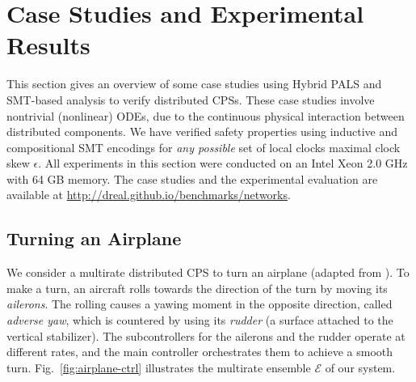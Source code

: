 
%
\section{Case Studies and Experimental Results}
\label{sec:case-studies}

This section gives an overview of some 
case studies using Hybrid PALS and SMT-based analysis to verify %
distributed CPSs. 
%
These case studies involve nontrivial (nonlinear) ODEs,
due to the  continuous physical interaction between distributed components.
We have verified safety properties 
using %
inductive and compositional SMT encodings
for \emph{any possible} set of  local clocks  maximal clock skew $\epsilon$.
%
All  experiments in this section
were conducted on an Intel Xeon 2.0 GHz with 64 GB memory.
The case studies and the experimental evaluation are available at %
\url{http://dreal.github.io/benchmarks/networks}. 




\subsection{Turning an Airplane}
\label{sec:ex-airplane}

We consider a multirate distributed CPS
to turn an airplane (adapted from \cite{ftscs-journal}).
%
To make a turn, an aircraft rolls towards the direction of the turn
by moving its \emph{ailerons}. %
The rolling causes 
a yawing moment in the opposite direction, called \emph{adverse yaw},
which is countered by using its \emph{rudder} (a surface attached to the vertical stabilizer).
%
The subcontrollers for the ailerons and the rudder operate at different rates, 
and the main controller orchestrates them to achieve a smooth turn.
%
Fig.~\ref{fig:airplane-ctrl} illustrates the multirate ensemble $\mathcal{E}$ of our system.



